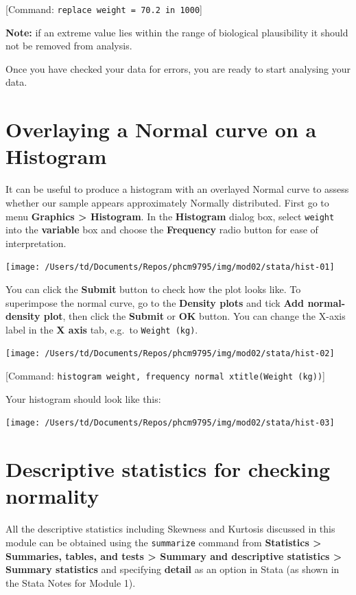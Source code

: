 \documentclass[
]{memoir}
\begin{document}
{[}Command: \texttt{replace\ weight\ =\ 70.2\ in\ 1000}{]}

\textbf{Note:} if an extreme value lies within the range of biological plausibility it should not be removed from analysis.

Once you have checked your data for errors, you are ready to start analysing your data.

\hypertarget{overlaying-a-normal-curve-on-a-histogram}{%
\section{Overlaying a Normal curve on a Histogram}\label{overlaying-a-normal-curve-on-a-histogram}}

It can be useful to produce a histogram with an overlayed Normal curve to assess whether our sample appears approximately Normally distributed. First go to menu \textbf{Graphics \textgreater{} Histogram}. In the \textbf{Histogram} dialog box, select \texttt{weight} into the \textbf{variable} box and choose the \textbf{Frequency} radio button for ease of interpretation.

\texttt{[image: /Users/td/Documents/Repos/phcm9795/img/mod02/stata/hist-01]}

You can click the \textbf{Submit} button to check how the plot looks like. To superimpose the normal curve, go to the \textbf{Density plots} and tick \textbf{Add normal-density plot}, then click the \textbf{Submit} or \textbf{OK} button. You can change the X-axis label in the \textbf{X axis} tab, e.g.~to \texttt{Weight\ (kg)}.

\texttt{[image: /Users/td/Documents/Repos/phcm9795/img/mod02/stata/hist-02]}

{[}Command: \texttt{histogram\ weight,\ frequency\ normal\ xtitle(Weight\ (kg))}{]}

Your histogram should look like this:

\texttt{[image: /Users/td/Documents/Repos/phcm9795/img/mod02/stata/hist-03]}

\hypertarget{descriptive-statistics-for-checking-normality}{%
\section{Descriptive statistics for checking normality}\label{descriptive-statistics-for-checking-normality}}

All the descriptive statistics including Skewness and Kurtosis discussed in this module can be obtained using the \texttt{summarize} command from \textbf{Statistics \textgreater{} Summaries, tables, and tests \textgreater{} Summary and descriptive statistics \textgreater{} Summary statistics} and specifying \textbf{detail} as an option in Stata (as shown in the Stata Notes for Module 1).
\end{document}
